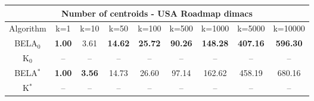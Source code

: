 \begin{tabular}{c|cccccccc}\toprule
\multicolumn{9}{c}{Number of centroids - USA Roadmap dimacs}\\ \midrule
Algorithm & k=1 & k=10 & k=50 & k=100 & k=500 & k=1000 & k=5000 & k=10000 \\ \midrule
BELA$_0$ & \textbf{1.00} & 3.61 & \textbf{14.62} & \textbf{25.72} & \textbf{90.26} & \textbf{148.28} & \textbf{407.16} & \textbf{596.30} \\
K$_0$ & -- & -- & -- & -- & -- & -- & -- & -- \\
BELA$^*$ & \textbf{1.00} & \textbf{3.56} & 14.73 & 26.60 & 97.14 & 162.62 & 458.19 & 680.16 \\
K$^*$ & -- & -- & -- & -- & -- & -- & -- & -- \\ \bottomrule 
\end{tabular}
